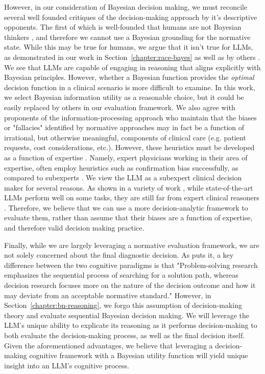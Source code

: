 However, in our consideration of Bayesian decision making, we must reconcile several well founded critiques of the decision-making approach by it's descriptive opponents. The first of which is well-founded that humans are not Bayesian thinkers \citep{gigerenzerToolsTheoriesHeuristic1991}, and therefore we cannot use a Bayesian grounding for the normative state. While this may be true for humans, we argue that it isn't true for LLMs, as demonstrated in our work in Section~\ref{chapter:race-bayes} as well as by others \cite{nafarProbabilisticReasoningGenerative2024b}. We see that LLMs are capable of engaging in reasoning that aligns explicitly with Bayesian principles. However, whether a Bayesian function provides the \emph{optimal} decision function in a clinical scenario is more difficult to examine. In this work, we select Bayesian information utility as a reasonable choice, but it could be easily replaced by others in our evaluation framework. We also agree with proponents of the information-processing approach who maintain that the biases or "fallacies" identified by normative approaches may in fact be a function of irrational, but otherwise meaningful, components of clinical care (e.g. patient requests, cost considerations, etc.). However, these heuristics must be developed as a function of expertise \cite{patel1991general}. Namely, expert physicians working in their area of expertise, often employ heuristics such as confirmation bias successfully, as compared to subexperts \cite{patelEmergingParadigmsCognition2002}. We view the LLM as a subexpert clinical decision maker for several reasons. As shown in a variety of work \cite{rydzewski2024comparative}, while state-of-the-art LLMs perform well on some tasks, they are still far from expert clinical reasoners \cite{harrisLargeLanguageModels2023}. Therefore, we believe that we can use a more decision-analytic framework to evaluate them, rather than assume that their biases are a function of expertise, and therefore valid decision making practice.

Finally, while we are largely leveraging a normative evaluation framework, we are not solely concerned about the final diagnostic decision. As \citet{patelEmergingParadigmsCognition2002} puts it, a key difference between the two cognitive paradigms is that "Problem-solving research emphasizes the sequential process of searching for a solution path, whereas decision research focuses more on the nature of the decision outcome and how it may deviate from an acceptable normative standard." However, in Section~\ref{chapter:bn-reasoning}, we forgo this assumption of decision-making theory and evaluate sequential Bayesian decision making. We will leverage the LLM's unique ability to explicate its reasoning as it performs decision-making to both evaluate the decision-making process, as well as the final decision itself. Given the aforementioned advantages, we believe that leveraging a decision-making cognitive framework with a Bayesian utility function will yield unique insight into an LLM's cognitive process. 
 
